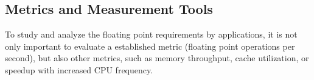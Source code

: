 %
%
%
%
%
%
%
%


\subsection{Metrics and Measurement Tools}\label{ssec:metrics}
%
%
%
To study and analyze the floating point requirements by applications, it is not only important to
evaluate a established metric (floating point operations per second), but also other metrics,
such as memory throughput, cache utilization, or speedup with increased CPU frequency.

